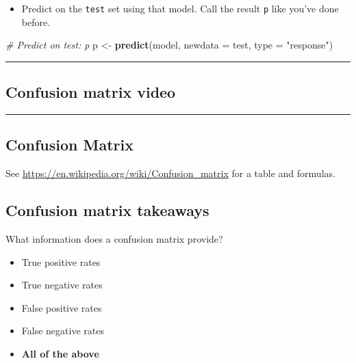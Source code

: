 \documentclass[
]{book}
\newenvironment{Shaded}{\begin{snugshade}}{\end{snugshade}}
\newcommand{\CommentTok}[1]{\textcolor[rgb]{0.56,0.35,0.01}{\textit{#1}}}
\newcommand{\DataTypeTok}[1]{\textcolor[rgb]{0.13,0.29,0.53}{#1}}
\newcommand{\KeywordTok}[1]{\textcolor[rgb]{0.13,0.29,0.53}{\textbf{#1}}}
\newcommand{\NormalTok}[1]{#1}
\newcommand{\StringTok}[1]{\textcolor[rgb]{0.31,0.60,0.02}{#1}}
\providecommand{\tightlist}{%
  \setlength{\itemsep}{0pt}\setlength{\parskip}{0pt}}
\begin{document}
\begin{itemize}
\tightlist
\item
  Predict on the \texttt{test} set using that model. Call the result \texttt{p} like you've done before.
\end{itemize}

\begin{Shaded}
\begin{Highlighting}[]
\CommentTok{# Predict on test: p}
\NormalTok{p <-}\StringTok{ }\KeywordTok{predict}\NormalTok{(model, }\DataTypeTok{newdata =}\NormalTok{ test, }\DataTypeTok{type =} \StringTok{"response"}\NormalTok{)}
\end{Highlighting}
\end{Shaded}

\begin{center}\rule{0.5\linewidth}{0.5pt}\end{center}

\hypertarget{confusion-matrix-video}{%
\subsection*{Confusion matrix video}\label{confusion-matrix-video}}

\begin{center}\rule{0.5\linewidth}{0.5pt}\end{center}

\hypertarget{confusion-matrix}{%
\subsection*{Confusion Matrix}\label{confusion-matrix}}

See \url{https://en.wikipedia.org/wiki/Confusion_matrix} for a table and formulas.

\hypertarget{confusion-matrix-takeaways}{%
\subsection*{Confusion matrix takeaways}\label{confusion-matrix-takeaways}}

What information does a confusion matrix provide?

\begin{itemize}
\item
  True positive rates
\item
  True negative rates
\item
  False positive rates
\item
  False negative rates
\item
  \textbf{All of the above}
\end{itemize}
\end{document}
